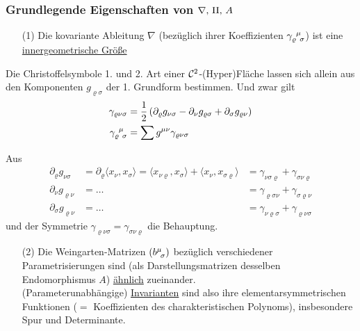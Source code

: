 \subsubsection{Grundlegende Eigenschaften von \(\nabla, \, \Rom 2, \, A\)}
\begin{enumerate}
 \item[(1)] Die kovariante Ableitung \(\nabla\) (bezüglich ihrer Koeffizienten \(\gamma_{\varrho \;\, \sigma}^{\;\, \mu}\)) ist eine \uline{innergeometrische Größe}
\end{enumerate}

\begin{satz}\label{satz215}
 Die Christoffelsymbole 1. und 2. Art einer \(\mathcal{C}^2\)-(Hyper)Fläche lassen sich allein aus den Komponenten \(g_{\varrho \sigma}\) der 1. Grundform bestimmen. Und zwar gilt
 \begin{align*}
  \gamma_{\varrho \nu \sigma} &= \frac12 \left( \partial_\varrho g_{\nu \sigma} - \partial_\nu g_{\varrho \sigma} + \partial_\sigma g_{\varrho \nu}\right) \\
  \gamma_{\varrho \;\, \sigma}^{\;\, \mu} &= \sum g^{\mu \nu} \gamma_{\varrho \nu \sigma}
 \end{align*}
\end{satz}

\begin{beweis}
 Aus 
 \begin{align*}
  \partial_\varrho g_{\nu \sigma} &= \partial_\varrho \langle x_\nu, x_\sigma \rangle = \langle x_{\nu \varrho}, x_\sigma \rangle + \langle x_\nu, x_{\sigma \varrho} \rangle &= \gamma_{\nu\sigma\varrho} + \gamma_{\sigma \nu \varrho} \\
  \partial_\nu g_{\varrho \nu} &= \dots &= \gamma_{\varrho \sigma \nu} + \gamma_{\sigma \varrho \nu} \\
  \partial_\sigma g_{\varrho \nu} &= \dots &= \gamma_{\nu \varrho \sigma} + \gamma_{\varrho \nu \sigma}
 \end{align*}
 und der Symmetrie \(\gamma_{\varrho \nu \sigma} = \gamma_{\sigma \nu \varrho}\) die Behauptung.
\end{beweis}

\begin{enumerate}
 \item[(2)] Die Weingarten-Matrizen \((b^{\mu}_{\;\, \sigma} )\) bezüglich verschiedener Parametrisierungen sind (als Darstellungsmatrizen desselben Endomorphismus \(A\)) \uline{ähnlich} zueinander. \\
 (Parameterunabhängige) \uline{Invarianten} sind also ihre elementarsymmetrischen Funktionen (\(=\) Koeffizienten des charakteristischen Polynoms), insbesondere Spur und Determinante.
\end{enumerate}

